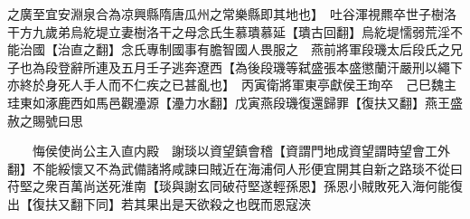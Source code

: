 之廣至宜安淵泉合為凉興縣隋唐瓜州之常樂縣即其地也】　吐谷渾視羆卒世子樹洛干方九歲弟烏紇堤立妻樹洛干之母念氏生慕璝慕延【璝古回翻】烏紇堤懦弱荒淫不能治國【治直之翻】念氏專制國事有膽智國人畏服之　燕前將軍段璣太后段氏之兄子也為段登辭所連及五月壬子逃奔遼西【為後段璣等弑盛張本盛懲蘭汗嚴刑以繩下亦終於身死人手人而不仁疾之已甚亂也】　丙寅衛將軍東亭獻侯王珣卒　己巳魏主珪東如涿鹿西如馬邑觀灅源【灅力水翻】戊寅燕段璣復還歸罪【復扶又翻】燕王盛赦之賜號曰思

　　悔侯使尚公主入直内殿　謝琰以資望鎮會稽【資謂門地成資望謂時望會工外翻】不能綏懷又不為武備諸將咸諫曰賊近在海浦伺人形便宜開其自新之路琰不從曰苻堅之衆百萬尚送死淮南【琰與謝玄同破苻堅遂輕孫恩】孫恩小賊敗死入海何能復出【復扶又翻下同】若其果出是天欲殺之也旣而恩寇浹